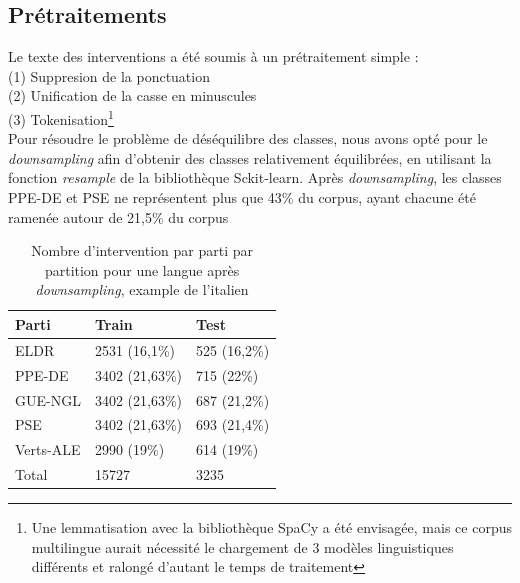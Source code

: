 \subsection{Prétraitements}
Le texte des interventions a été soumis à un prétraitement simple :\\
\indent(1) Suppresion de la ponctuation\\
\indent(2) Unification de la casse en minuscules\\
\indent(3) Tokenisation\footnote {Une lemmatisation avec la bibliothèque SpaCy a été envisagée,
mais ce corpus multilingue aurait nécessité le chargement de 3 modèles linguistiques
différents et ralongé d'autant le temps de traitement}
\\
Pour résoudre le problème de déséquilibre des classes, nous avons opté pour le 
\textit{downsampling} afin d'obtenir des classes relativement équilibrées,
en utilisant la fonction \textit{resample} de la bibliothèque Sckit-learn. Après \textit{downsampling},
les classes PPE-DE et PSE ne représentent plus que 43\% du corpus, ayant chacune été ramenée autour de 21,5\% du corpus

\begin{table}[ht]
    \centering
\begin{tabular}{|l|l|l|}
\hline
Parti & Train & Test\\ \hline
ELDR & 2531 (16,1\%) & 525 (16,2\%) \\ \hline
PPE-DE & 3402 (21,63\%) & 715 (22\%) \\ \hline
GUE-NGL & 3402 (21,63\%) & 687 (21,2\%) \\ \hline
PSE & 3402 (21,63\%) & 693 (21,4\%) \\ \hline
Verts-ALE & 2990 (19\%) & 614 (19\%)\\ \hline
Total & 15727 & 3235\\ \hline
\end{tabular}
\caption{Nombre d'intervention par parti par partition pour une langue après \textit{downsampling}, example de l'italien}
\label{tab:stats_downsampled}
\end{table}


